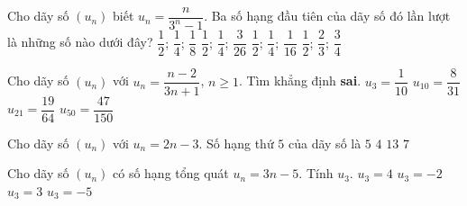 

\begin{ex}%
	Cho dãy số $(u_n)$ biết $u_n=\dfrac{n}{3^n-1}$. Ba số hạng  đầu tiên của dãy số đó lần lượt là những số nào dưới đây?
	\choice 
		{$\dfrac{1}{2}$;  $\dfrac{1}{4}$; $\dfrac{1}{8}$}
		{\True $\dfrac{1}{2}$; $\dfrac{1}{4}$;  $\dfrac{3}{26}$}
		{$\dfrac{1}{2}$;  $\dfrac{1}{4}$; $\dfrac{1}{16}$}
		{$\dfrac{1}{2}$;  $\dfrac{2}{3}$; $\dfrac{3}{4}$}
\end{ex}

\begin{ex}%
	Cho dãy  số $(u_n)$ với $u_n=\dfrac{n-2}{3n+1}$, $n \ge 1$. Tìm khẳng định \textbf{sai}.
	 \choice
		{$u_3=\dfrac{1}{10}$} 
		{$u_{10}=\dfrac{8}{31}$} 
		 {$u_{21}=\dfrac{19}{64}$}
		 {\True $u_{50}=\dfrac{47}{150}$}
\end{ex}

\begin{ex}%
	Cho dãy số $(u_n)$ với $u_n=2n-3$. Số hạng thứ  $5$ của dãy số là
	\choice 
		 {$5$}
		 {$4$}
		{$13$} 
		{\True $7$} 
\end{ex}

\begin{ex}%
	Cho dãy số $(u_n)$ có số hạng tổng quát $u_n = 3n  - 5$. Tính $u_3$.
	 \choice
		 {\True $u_3 = 4$}
		{$u_3 = -2$} 
		{$u_3 = 3$} 
		{$u_3 = -5$} 
\end{ex}

